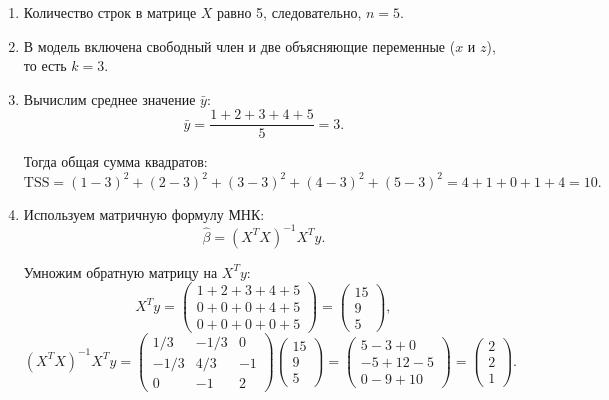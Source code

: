 \documentclass[12pt]{article}
\begin{document}
\begin{sol}
\begin{enumerate}
    \item Количество строк в матрице $X$ равно 5, следовательно, $n = 5$.
    
    \item В модель включена  свободный член и две объясняющие переменные ($x$ и $z$), то есть $k = 3$.
    
    \item Вычислим среднее значение $\bar{y}$:
    \[
    \bar{y} = \frac{1 + 2 + 3 + 4 + 5}{5} = 3.
    \]
    
    Тогда общая сумма квадратов:
    \[
    \text{TSS} = (1-3)^2 + (2-3)^2 + (3-3)^2 + (4-3)^2 + (5-3)^2 = 4 + 1 + 0 + 1 + 4 = 10.
    \]
    
    \item Используем матричную формулу МНК:
    \[
    \hat{\beta} = (X^T X)^{-1} X^T y.
    \]
    
    Умножим обратную матрицу на $X^T y$:
    \[
    X^T y = \begin{pmatrix} 1+2+3+4+5 \\ 0+0+0+4+5 \\ 0+0+0+0+5 \end{pmatrix} = \begin{pmatrix} 15 \\ 9 \\ 5 \end{pmatrix},
    \]
    \[
    (X^T X)^{-1} X^T y = \begin{pmatrix} 
      1/3 & -1/3 & 0 \\ 
      -1/3 & 4/3 & -1 \\ 
      0 & -1 & 2 \end{pmatrix} 
      \begin{pmatrix} 15 \\ 9 \\ 5 \end{pmatrix} = 
      \begin{pmatrix} 
      5 - 3 + 0 \\ 
      -5 + 12 - 5 \\ 
      0 - 9 + 10 \end{pmatrix} = 
      \begin{pmatrix} 2 \\ 2 \\ 1 \end{pmatrix}.
    \]
    

\end{enumerate}
\end{sol}
\end{document}

